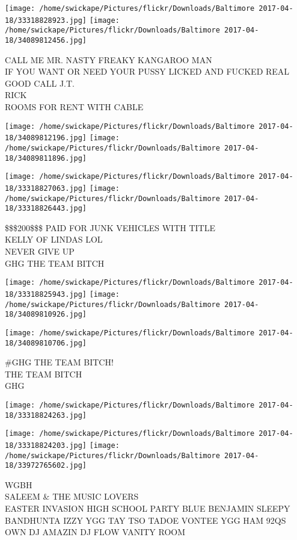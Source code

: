 \documentclass[10pt,letterpaper]{article}
\begin{document}
\texttt{[image: /home/swickape/Pictures/flickr/Downloads/Baltimore 2017-04-18/33318828923.jpg]}
\texttt{[image: /home/swickape/Pictures/flickr/Downloads/Baltimore 2017-04-18/34089812456.jpg]}

CALL ME MR. NASTY FREAKY KANGAROO MAN\\
IF YOU WANT OR NEED YOUR PUSSY LICKED AND FUCKED REAL GOOD CALL J.T.\\
RICK\\
ROOMS FOR RENT WITH CABLE
\pagebreak

\texttt{[image: /home/swickape/Pictures/flickr/Downloads/Baltimore 2017-04-18/34089812196.jpg]}
\texttt{[image: /home/swickape/Pictures/flickr/Downloads/Baltimore 2017-04-18/34089811896.jpg]}

\texttt{[image: /home/swickape/Pictures/flickr/Downloads/Baltimore 2017-04-18/33318827063.jpg]}
\texttt{[image: /home/swickape/Pictures/flickr/Downloads/Baltimore 2017-04-18/33318826443.jpg]}

\$\$\$200\$\$\$ PAID FOR JUNK VEHICLES WITH TITLE\\
KELLY OF LINDAS LOL\\
NEVER GIVE UP\\
GHG THE TEAM BITCH
\pagebreak

\texttt{[image: /home/swickape/Pictures/flickr/Downloads/Baltimore 2017-04-18/33318825943.jpg]}
\texttt{[image: /home/swickape/Pictures/flickr/Downloads/Baltimore 2017-04-18/34089810926.jpg]}

\texttt{[image: /home/swickape/Pictures/flickr/Downloads/Baltimore 2017-04-18/34089810706.jpg]}

\#GHG THE TEAM BITCH!\\
THE TEAM BITCH\\
GHG
\pagebreak

\texttt{[image: /home/swickape/Pictures/flickr/Downloads/Baltimore 2017-04-18/33318824263.jpg]}

\vspace{0.25in}
\texttt{[image: /home/swickape/Pictures/flickr/Downloads/Baltimore 2017-04-18/33318824203.jpg]}
\texttt{[image: /home/swickape/Pictures/flickr/Downloads/Baltimore 2017-04-18/33972765602.jpg]}

WGBH\\
SALEEM \& THE MUSIC LOVERS\\
EASTER INVASION HIGH SCHOOL PARTY BLUE BENJAMIN SLEEPY BANDHUNTA IZZY YGG TAY TSO TADOE VONTEE YGG HAM 92QS OWN DJ AMAZIN DJ FLOW VANITY ROOM
\pagebreak
\end{document}
